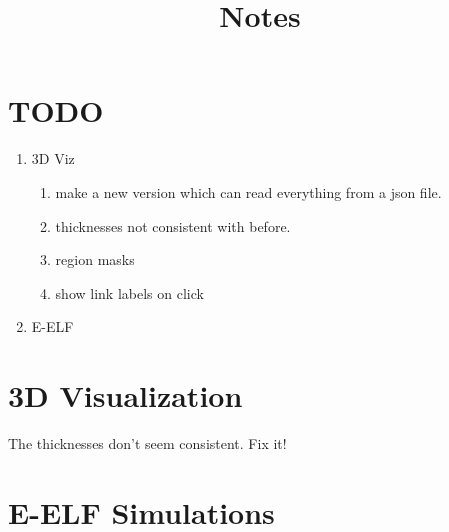 \documentclass[nofootinbib,preprint,floatfix]{revtex4} %
\begin{document}
\title{Notes}
\maketitle

\section{TODO}
\begin{enumerate}
    \item 3D Viz
    \begin{enumerate}
        \item make a new version which can read everything from a json file.
        \item thicknesses not consistent with before.
        \item region masks
        \item show link labels on click 
    \end{enumerate}
    \item E-ELF
\end{enumerate}

\section{3D Visualization}
The thicknesses don't seem consistent. Fix it! 




\section{E-ELF Simulations}
\end{document}
